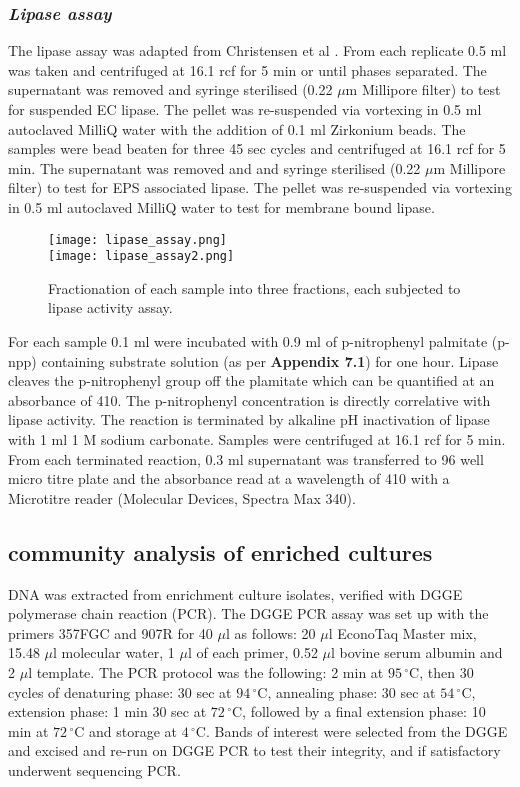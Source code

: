 \documentclass[11pt]{article}
\begin{document}
\subsubsection{\emph{Lipase assay}}
The lipase assay was adapted from Christensen et al \cite{christensen_03}. From each replicate 0.5 ml was taken and centrifuged at 16.1 rcf for 5 min or until phases separated. The supernatant was removed and syringe sterilised (0.22 $\mu$m Millipore filter) to test for suspended EC lipase.
The pellet was re-suspended via vortexing in 0.5 ml autoclaved MilliQ water with the addition of 0.1 ml Zirkonium beads. The samples were bead beaten for three 45 sec cycles and centrifuged at 16.1 rcf for 5 min. The supernatant was removed and and syringe sterilised (0.22 $\mu$m Millipore filter) to test for EPS associated lipase.
The pellet was re-suspended via vortexing in 0.5 ml autoclaved MilliQ water to test for membrane bound lipase.\\


\begin{figure}
\begin{center}
\texttt{[image: lipase\_assay.png]}\\
\texttt{[image: lipase\_assay2.png]}
\caption{Fractionation of each sample into three fractions, each subjected to lipase activity assay.}
\end{center}
\end{figure}

For each sample 0.1 ml were incubated with 0.9 ml of  p-nitrophenyl palmitate (p-npp) containing substrate solution (as per \textbf{Appendix 7.1}) for one hour. Lipase cleaves the p-nitrophenyl group off the plamitate which can be quantified at an absorbance of 410. The p-nitrophenyl concentration is directly correlative with lipase activity. The reaction is terminated by alkaline pH inactivation of lipase with 1 ml 1 M sodium carbonate. Samples were centrifuged at 16.1 rcf for 5 min. From each terminated reaction, 0.3 ml supernatant was transferred to 96 well micro titre plate and the absorbance read at a wavelength of 410 with a Microtitre reader (Molecular Devices, Spectra Max 340).
\FloatBarrier
\subsection{community analysis of enriched cultures}
DNA was extracted from enrichment culture isolates, verified with DGGE polymerase chain reaction (PCR). The DGGE PCR assay was set up with the primers 357FGC and 907R for 40 $\mu$l as follows: 20 $\mu$l EconoTaq Master mix, 15.48 $\mu$l molecular water, 1 $\mu$l of each primer, 0.52 $\mu$l bovine serum albumin and 2 $\mu$l template. The PCR protocol was the following: 2 min at $95\,^{\circ}\mathrm{C}$, then 30 cycles of denaturing phase: 30 sec at $94\,^{\circ}\mathrm{C}$, annealing phase: 30 sec at  $54\,^{\circ}\mathrm{C}$, extension phase: 1 min 30 sec at $72\,^{\circ}\mathrm{C}$, followed by a final extension phase: 10 min at $72\,^{\circ}\mathrm{C}$ and storage at $4\,^{\circ}\mathrm{C}$.
Bands of interest were selected from the DGGE and excised and re-run on DGGE PCR to test their integrity, and if satisfactory underwent sequencing PCR. 
\end{document}
